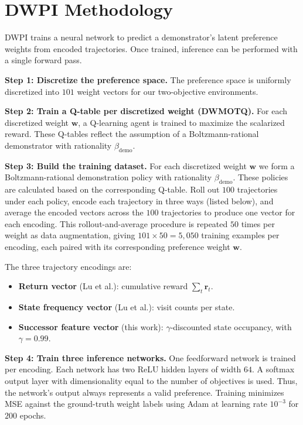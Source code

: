 \documentclass[11pt]{article}
\begin{document}
\newpage
\section{DWPI Methodology}

DWPI \cite{lu2023} trains a neural network to predict a demonstrator's latent preference weights from encoded trajectories. Once trained, inference can be performed with a single forward pass.

\textbf{Step 1: Discretize the preference space.} The preference space is uniformly discretized into $101$ weight vectors for our two-objective environments.

\textbf{Step 2: Train a Q-table per discretized weight (DWMOTQ).} For each discretized weight $\mathbf{w}$, a Q-learning agent is trained to maximize the scalarized reward. These Q-tables reflect the assumption of a Boltzmann-rational demonstrator with rationality $\beta_{\text{demo}}$.

\textbf{Step 3: Build the training dataset.} For each discretized weight $\mathbf{w}$ we form a Boltzmann-rational demonstration policy with rationality $\beta_{\text{demo}}$. These policies are calculated based on the corresponding Q-table. Roll out $100$ trajectories under each policy, encode each trajectory in three ways (listed below), and average the encoded vectors across the $100$ trajectories to produce one vector for each encoding. This rollout-and-average procedure is repeated $50$ times per weight as data augmentation, giving $101 \times 50 = 5{,}050$ training examples per encoding, each paired with its corresponding preference weight $\mathbf{w}$.

The three trajectory encodings are:
\begin{itemize}
    \item \textbf{Return vector} (Lu et al.): cumulative reward $\sum_t \mathbf{r}_t$.
    \item \textbf{State frequency vector} (Lu et al.): visit counts per state.
    \item \textbf{Successor feature vector} (this work): $\gamma$-discounted state occupancy, with $\gamma = 0.99$.
\end{itemize}

\textbf{Step 4: Train three inference networks.} One feedforward network is trained per encoding. Each network has two ReLU hidden layers of width $64$. A softmax output layer with dimensionality equal to the number of objectives is used. Thus, the network's output always represents a valid preference. Training minimizes MSE against the ground-truth weight labels using Adam at learning rate $10^{-3}$ for $200$ epochs.
\end{document}
